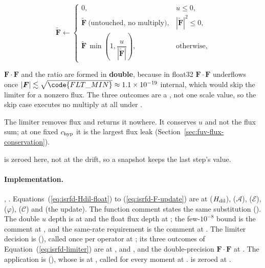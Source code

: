 \begin{equation}
  \tilde{\boldsymbol{F}} \longleftarrow
  \begin{cases}
    0, & u \le 0,\\
    \tilde{\boldsymbol{F}} \ \text{(untouched, no multiply)}, & |\tilde{\boldsymbol{F}}|^2 \le 0,\\
    \tilde{\boldsymbol{F}}\,\min\!\left(1, \dfrac{u}{|\tilde{\boldsymbol{F}}|}\right), & \text{otherwise},
  \end{cases}
  \label{eq:isrfd-limiter}
\end{equation}

$\boldsymbol{F}\!\cdot\!\boldsymbol{F}$ and the ratio are formed in
\textbf{double}, because in float32
$\boldsymbol{F}\!\cdot\!\boldsymbol{F}$ underflows once
$|\boldsymbol{F}| \lesssim \sqrt{\code{FLT\_MIN}} \approx 1.1\times10^{-19}$
internal, which would skip the limiter for a nonzero flux. The three outcomes
are a , not one scale value, so the skip case executes no multiply at
all under .

The limiter removes flux and returns it nowhere. It conserves $u$ and
not the flux sum; at one fixed $c_{\rm hyp}$ it is the largest flux leak
(Section~\ref{sec:fuv-flux-conservation}).

 is zeroed here, not at the drift, so a snapshot keeps
the last step's value.

\paragraph{Implementation.} ,
. Equations~(\ref{eq:isrfd-Hdil-float}) to
(\ref{eq:isrfd-F-update}) are at  ($H_{\rm dil}$),
 ($\mathcal{A}$),  ($\mathcal{E}$), 
($\varphi$),  ($\mathcal{C}$) and  (the update). The
function comment states the same substitution ().
The double $u$ depth is at  and the float flux depth
at ; the few-$10^{-8}$ bound is the comment at
, and the same-rate requirement is the comment at
. The limiter decision is
(), called once per operator at
; its three outcomes of
Equation~(\ref{eq:isrfd-limiter}) are at , 
and , and the double-precision $\boldsymbol{F}\!\cdot\!\boldsymbol{F}$
at . The application is 
(), whose  is at , called
for every moment at . 
is zeroed at .

